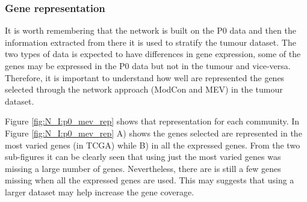 \subsubsection{Gene representation}

It is worth remembering that the network is built on the P0 data and then the information extracted from there it is used to stratify the tumour dataset. The two types of data is expected to have differences in gene expression, some of the genes may be expressed in the P0 data but not in the tumour and vice-versa. Therefore, it is important to understand how well are represented the genes selected through the network approach (ModCon and MEV) in the tumour dataset. 


Figure \ref{fig:N_I:p0_mev_rep} shows that representation for each community. In Figure \ref{fig:N_I:p0_mev_rep} A) shows the genes selected are represented in the most varied genes (in TCGA) while B) in all the expressed genes. From the two sub-figures it can be clearly seen that using just the most varied genes was missing a large number of genes. Nevertheless, there are is still a few genes missing when all the expressed genes are used. This may suggests that using a larger dataset may help increase the gene coverage. 


